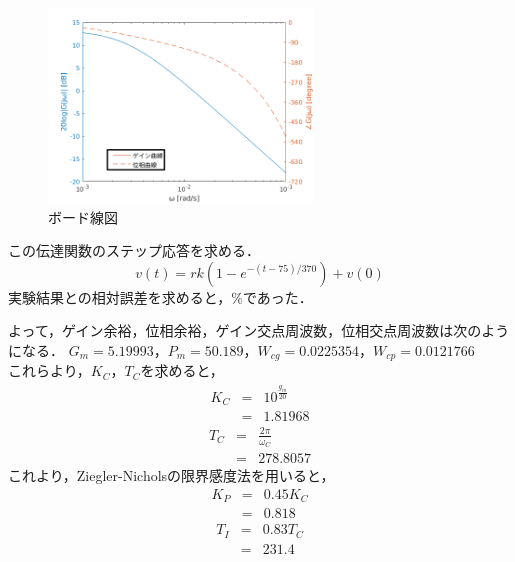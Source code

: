 \documentclass[12pt]{jsarticle}
\begin{document}
\begin{figure}[tb]
  \begin{center}
    \includegraphics[clip,width=7.0cm]{../graph/BodeDiagram.png}
    \caption{ボード線図}
    \label{BodeDiagram}
  \end{center}
\end{figure}

この伝達関数のステップ応答を求める．
\begin{equation}
  \label{}
  v(t) = rk(1 - e^{-(t - 75)/370}) + v(0)
\end{equation}
実験結果との相対誤差を求めると，$\%$であった．

よって，ゲイン余裕，位相余裕，ゲイン交点周波数，位相交点周波数は次のようになる．
$G_m=5.19993$，$P_m=50.189$，$W_{cg}=0.0225354$，$W_{cp}=0.0121766$ \\
これらより，$K_C$，$T_C$を求めると，
\begin{eqnarray}
  \label{}
  K_C &=& 10^{\frac{g_m}{20}} \\
  &=& 1.81968
\end{eqnarray}
\begin{eqnarray}
  \label{}
  T_C &=& \frac{2\pi}{\omega_C} \\
  &=& 278.8057
\end{eqnarray}
これより，Ziegler-Nicholsの限界感度法を用いると，
\begin{eqnarray}
  \label{}
  K_P &=& 0.45 K_C \\
  &=& 0.818
\end{eqnarray}
\begin{eqnarray}
  T_I &=& 0.83 T_C \\
  &=& 231.4
\end{eqnarray}
\end{document}
